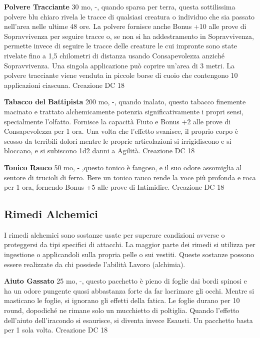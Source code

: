 \documentclass[a4paper,11pt,twoside,openany]{book}
\begin{document}
{\textbf{Polvere Tracciante} 30 mo, -, quando sparsa per terra, questa sottilissima polvere blu chiaro rivela le tracce di qualsiasi creatura o individuo che sia passato nell'area nelle ultime 48 ore.
La polvere fornisce anche Bonus +10 alle prove di Sopravvivenza per seguire tracce o, se non si ha addestramento in Sopravvivenza, permette invece di seguire le tracce delle creature le cui impronte sono state rivelate fino a 1,5 chilometri di distanza usando Consapevolezza anziché Sopravvivenza. Una singola applicazione può coprire un'area di 3 metri. 
La polvere tracciante viene venduta in piccole borse di cuoio che contengono 10 applicazioni ciascuna. Creazione DC 18

\textbf{Tabacco del Battipista} 200 mo, -, quando inalato, questo tabacco finemente macinato e trattato alchemicamente potenzia significativamente i propri sensi, specialmente l'olfatto. Fornisce la capacità Fiuto e Bonus +2 alle prove di Consapevolezza per 1 ora. Una volta che l'effetto svanisce, il proprio corpo è scosso da terribili dolori mentre le proprie articolazioni si irrigidiscono e si bloccano, e si subiscono 1d2 danni a Agilità. Creazione DC 18

\textbf{Tonico Rauco} 50 mo, - ,questo tonico è fangoso, e il suo odore assomiglia al sentore di trucioli di ferro. Bere un tonico rauco rende la voce più profonda e roca per 1 ora, fornendo Bonus +5 alle prove di Intimidire. Creazione DC 18

\subsection{Rimedi Alchemici}

\label{rimedi-alchemici}

I rimedi alchemici sono sostanze usate per superare condizioni avverse o proteggersi da tipi specifici di attacchi. La maggior parte dei rimedi si utilizza per ingestione o applicandoli sulla propria pelle o sui vestiti. Queste sostanze possono essere realizzate da chi possiede l'abilità Lavoro (alchimia).

\textbf{Aiuto Gassato} 25 mo, -, questo pacchetto è pieno di foglie dai bordi spinosi e ha un odore pungente quasi abbastanza forte da far lacrimare gli occhi. Mentre si masticano le foglie, si ignorano gli effetti della fatica. Le foglie durano per 10 round, dopodiché ne rimane solo un mucchietto di poltiglia.
Quando l'effetto dell'aiuto dell'iracondo si esaurisce, si diventa invece Esausti. Un pacchetto basta per 1 sola volta. Creazione DC 18

}
\end{document}
